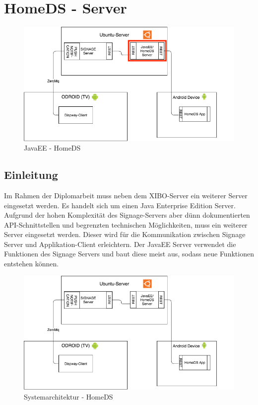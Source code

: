 \chapter{HomeDS - Server}

\begin{figure}[H]
\centering
\includegraphics[width=1\textwidth]{images/08_HomeDsWeb/javaee.png}
\caption{JavaEE - HomeDS}
\label{img:javaeebigpicture}
\end{figure}

\section{Einleitung}\label{sec:einleitung}
Im Rahmen der Diplomarbeit muss neben dem XIBO-Server ein weiterer Server eingesetzt werden. Es handelt sich um einen Java Enterprise Edition Server. Aufgrund der hohen Komplexität des Signage-Servers aber dünn dokumentierten API-Schnittstellen und begrenzten technischen Möglichkeiten, muss ein weiterer Server eingesetzt werden. Dieser wird für die Kommunikation zwischen Signage Server und Applikation-Client erleichtern. Der JavaEE Server verwendet die Funktionen des Signage Servers und baut diese meist aus, sodass neue Funktionen entstehen können.

\begin{figure}[H]
\centering
\includegraphics[width=1\textwidth]{images/08_HomeDsWeb/SystemArch.png}
\caption{Systemarchitektur - HomeDS}
\label{img:systemarchitektur}
\end{figure}
 
